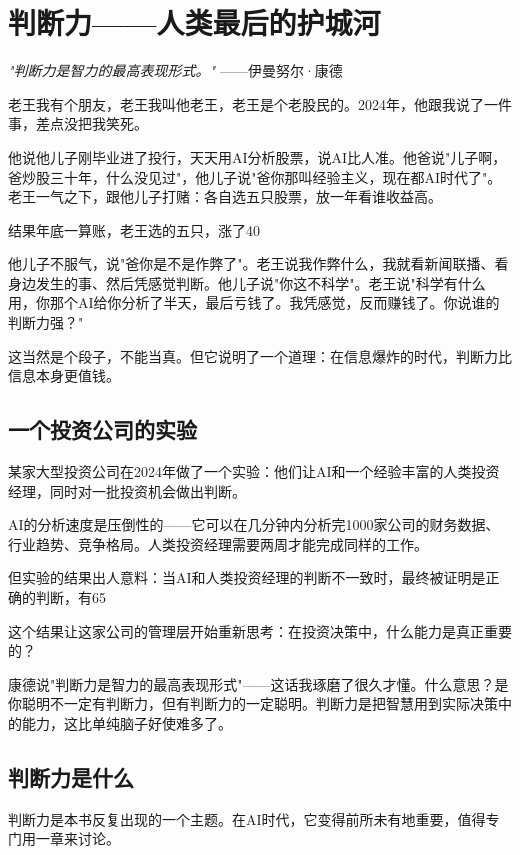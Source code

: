 \chapter{判断力——人类最后的护城河}


\textit{"判断力是智力的最高表现形式。"}
——伊曼努尔·康德


老王我有个朋友，老王我叫他老王，老王是个老股民的。2024年，他跟我说了一件事，差点没把我笑死。

他说他儿子刚毕业进了投行，天天用AI分析股票，说AI比人准。他爸说"儿子啊，爸炒股三十年，什么没见过"，他儿子说"爸你那叫经验主义，现在都AI时代了"。老王一气之下，跟他儿子打赌：各自选五只股票，放一年看谁收益高。

结果年底一算账，老王选的五只，涨了40%

他儿子不服气，说"爸你是不是作弊了"。老王说我作弊什么，我就看新闻联播、看身边发生的事、然后凭感觉判断。他儿子说"你这不科学"。老王说"科学有什么用，你那个AI给你分析了半天，最后亏钱了。我凭感觉，反而赚钱了。你说谁的判断力强？"

这当然是个段子，不能当真。但它说明了一个道理：在信息爆炸的时代，判断力比信息本身更值钱。

\section{一个投资公司的实验}


某家大型投资公司在2024年做了一个实验：他们让AI和一个经验丰富的人类投资经理，同时对一批投资机会做出判断。

AI的分析速度是压倒性的——它可以在几分钟内分析完1000家公司的财务数据、行业趋势、竞争格局。人类投资经理需要两周才能完成同样的工作。

但实验的结果出人意料：当AI和人类投资经理的判断不一致时，最终被证明是正确的判断，有65%

这个结果让这家公司的管理层开始重新思考：在投资决策中，什么能力是真正重要的？

康德说"判断力是智力的最高表现形式"——这话我琢磨了很久才懂。什么意思？是你聪明不一定有判断力，但有判断力的一定聪明。判断力是把智慧用到实际决策中的能力，这比单纯脑子好使难多了。

\section{判断力是什么}


判断力是本书反复出现的一个主题。在AI时代，它变得前所未有地重要，值得专门用一章来讨论。

